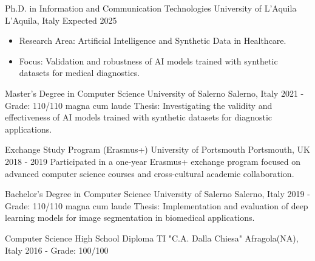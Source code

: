 
\cventry
  {Ph.D. in Information and Communication Technologies}
  {University of L'Aquila}
  {L'Aquila, Italy}
  {Expected 2025}
  {
    \begin{itemize}
      \item Research Area: Artificial Intelligence and Synthetic Data in Healthcare.
      \item Focus: Validation and robustness of AI models trained with synthetic datasets for medical diagnostics.
    \end{itemize}
  }
  {}

\cventry
  {Master's Degree in Computer Science}
  {University of Salerno}
  {Salerno, Italy}
  {2021 - Grade: 110/110 magna cum laude}
  {
    Thesis: Investigating the validity and effectiveness of AI models trained with synthetic datasets for diagnostic applications.
  }
  {}

\cventry
  {Exchange Study Program (Erasmus+)}
  {University of Portsmouth}
  {Portsmouth, UK}
  {2018 - 2019}
  {
    Participated in a one-year Erasmus+ exchange program focused on advanced computer science courses and cross-cultural academic collaboration.
  }
  {}

\cventry
  {Bachelor's Degree in Computer Science}
  {University of Salerno}
  {Salerno, Italy}
  {2019 - Grade: 110/110 magna cum laude}
  {Thesis: Implementation and evaluation of deep learning models for image segmentation in biomedical applications.}
  {}


\cventry
  {Computer Science High School Diploma}
  {TI "C.A. Dalla Chiesa"}
  {Afragola(NA), Italy}
  {2016 - Grade: 100/100}
  {}